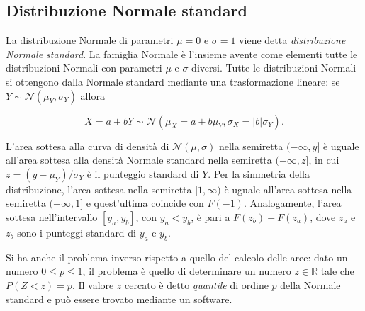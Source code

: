 \documentclass[
  11pt,
]{krantz}
\theoremstyle{definition}
\theoremstyle{definition}
\theoremstyle{definition}
\theoremstyle{definition}
\theoremstyle{remark}
\begin{document}
\hypertarget{distribuzione-normale-standard}{%
\subsection{Distribuzione Normale standard}\label{distribuzione-normale-standard}}

La distribuzione Normale di parametri \(\mu = 0\) e \(\sigma = 1\) viene detta \emph{distribuzione Normale standard}. La famiglia Normale è l'insieme avente come elementi tutte le distribuzioni Normali con parametri \(\mu\) e \(\sigma\) diversi. Tutte le distribuzioni Normali si ottengono dalla Normale standard mediante una trasformazione lineare: se \(Y \sim \mathcal{N}(\mu_Y, \sigma_Y)\) allora

\begin{equation}
X = a + b Y \sim \mathcal{N}(\mu_X = a+b \mu_Y, \sigma_X = \left|b\right|\sigma_Y).
\end{equation}

L'area sottesa alla curva di densità di \(\mathcal{N}(\mu, \sigma)\) nella semiretta \((-\infty, y]\) è uguale all'area sottesa alla densità Normale standard nella semiretta \((-\infty, z]\), in cui \(z = (y -\mu_Y )/\sigma_Y\) è il punteggio standard di \(Y\). Per la simmetria della distribuzione, l'area sottesa nella semiretta \([1, \infty)\) è uguale all'area sottesa nella semiretta \((-\infty, 1]\) e quest'ultima coincide con \(F(-1)\). Analogamente, l'area sottesa nell'intervallo \([y_a, y_b]\), con \(y_a < y_b\), è pari a \(F(z_b) - F(z_a)\), dove \(z_a\) e \(z_b\) sono i punteggi standard di \(y_a\) e \(y_b\).

Si ha anche il problema inverso rispetto a quello del calcolo delle aree: dato un numero \(0 \leq p \leq 1\), il problema è quello di determinare un numero \(z \in \mathbb{R}\) tale che \(P(Z < z) = p\). Il valore \(z\) cercato è detto \emph{quantile} di ordine \(p\) della Normale standard e può essere trovato mediante un software.
\end{document}
